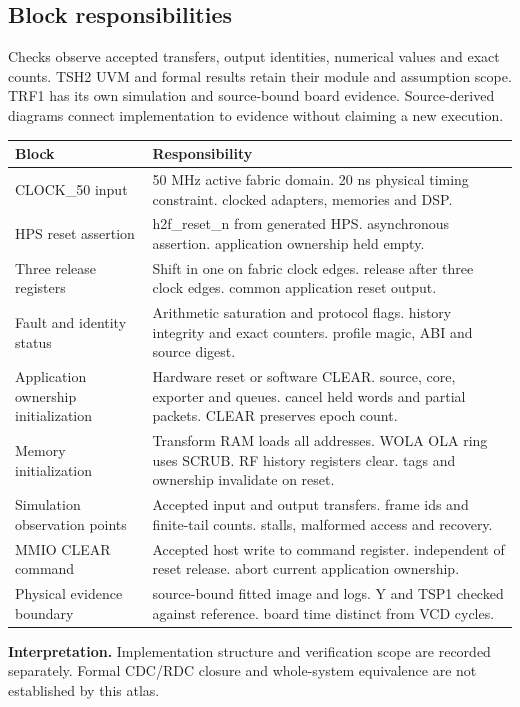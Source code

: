 \documentclass[11pt,letterpaper]{article}
\begin{document}
\subsection*{Block responsibilities}
Checks observe accepted transfers, output identities, numerical values and exact counts. TSH2 UVM and formal results retain their module and assumption scope. TRF1 has its own simulation and source-bound board evidence. Source-derived diagrams connect implementation to evidence without claiming a new execution.
\par\medskip\noindent
\begin{tabularx}{\linewidth}{@{}>{\raggedright\arraybackslash}p{1.65in}Y@{}}\toprule
\textbf{Block} & \textbf{Responsibility} \\ \midrule
CLOCK\_50 input & 50 MHz active fabric domain. 20 ns physical timing constraint. clocked adapters, memories and DSP. \\[5pt]
HPS reset assertion & h2f\_reset\_n from generated HPS. asynchronous assertion. application ownership held empty. \\[5pt]
Three release registers & Shift in one on fabric clock edges. release after three clock edges. common application reset output. \\[5pt]
Fault and identity status & Arithmetic saturation and protocol flags. history integrity and exact counters. profile magic, ABI and source digest. \\[5pt]
Application ownership initialization & Hardware reset or software CLEAR. source, core, exporter and queues. cancel held words and partial packets. CLEAR preserves epoch count. \\[5pt]
Memory initialization & Transform RAM loads all addresses. WOLA OLA ring uses SCRUB. RF history registers clear. tags and ownership invalidate on reset. \\[5pt]
Simulation observation points & Accepted input and output transfers. frame ids and finite-tail counts. stalls, malformed access and recovery. \\[5pt]
MMIO CLEAR command & Accepted host write to command register. independent of reset release. abort current application ownership. \\[5pt]
Physical evidence boundary & source-bound fitted image and logs. Y and TSP1 checked against reference. board time distinct from VCD cycles. \\[5pt]
\bottomrule\end{tabularx}
\vspace{8pt}
\noindent\textbf{Interpretation.} Implementation structure and verification scope are recorded separately. Formal CDC/RDC closure and whole-system equivalence are not established by this atlas.
\clearpage
\end{document}
